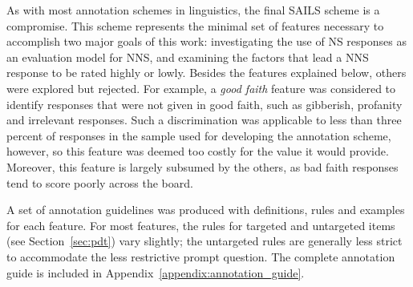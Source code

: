 As with most annotation schemes in linguistics, the final SAILS scheme is a compromise. This scheme represents the minimal set of features necessary to accomplish two major goals of this work: investigating the use of NS responses as an evaluation model for NNS, and examining the factors that lead a NNS response to be rated highly or lowly. Besides the features explained below, others were explored but rejected. For example, a \textit{good faith} feature was considered to identify responses that were not given in good faith, such as gibberish, profanity and irrelevant responses. Such a discrimination was applicable to less than three percent of responses in the sample used for developing the annotation scheme, however, so this feature was deemed too costly for the value it would provide. Moreover, this feature is largely subsumed by the others, as bad faith responses tend to score poorly across the board.

A set of annotation guidelines was produced with definitions, rules and examples for each feature. For most features, the rules for targeted and untargeted items (see Section~\ref{sec:pdt}) vary slightly; the untargeted rules are generally less strict to accommodate the less restrictive prompt question. The complete annotation guide is included in Appendix~\ref{appendix:annotation_guide}.

